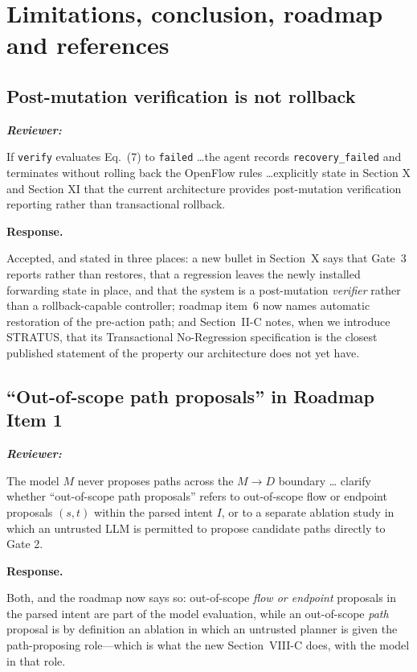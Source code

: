 \documentclass[11pt,a4paper]{article}
\newenvironment{reviewer}{\par\medskip\noindent\begin{minipage}{\linewidth}\small\itshape\color{quote}\textbf{Reviewer:}\par}{\end{minipage}\medskip\par}
\newenvironment{response}{\par\noindent\begin{minipage}{\linewidth}\small\textbf{Response.}\par}{\end{minipage}\medskip\par}
\begin{document}
\section{Limitations, conclusion, roadmap and references}

\subsection{Post-mutation verification is not rollback}

\begin{reviewer}
If \texttt{verify} evaluates Eq.~(7) to \texttt{failed} \dots the agent
records \texttt{recovery\_failed} and terminates without rolling back the
OpenFlow rules \dots explicitly state in Section X and Section XI that the
current architecture provides post-mutation verification reporting rather
than transactional rollback.
\end{reviewer}

\begin{response}
Accepted, and stated in three places: a new bullet in Section~X says
that Gate~3 reports rather than restores, that a regression leaves the
newly installed forwarding state in place, and that the system is a
post-mutation \emph{verifier} rather than a rollback-capable controller;
roadmap item~6 now names automatic restoration of the pre-action path; and
Section~II-C notes, when we introduce STRATUS, that its Transactional
No-Regression specification is the closest published statement of the
property our architecture does not yet have.
\end{response}

\subsection{``Out-of-scope path proposals'' in Roadmap Item 1}

\begin{reviewer}
The model $M$ never proposes paths across the $M \to D$ boundary \dots
clarify whether ``out-of-scope path proposals'' refers to out-of-scope
flow or endpoint proposals $(s,t)$ within the parsed intent $I$, or to a
separate ablation study in which an untrusted LLM is permitted to propose
candidate paths directly to Gate 2.
\end{reviewer}

\begin{response}
Both, and the roadmap now says so: out-of-scope \emph{flow or endpoint}
proposals in the parsed intent are part of the model evaluation, while an
out-of-scope \emph{path} proposal is by definition an ablation in which an
untrusted planner is given the path-proposing role---which is what the new
Section~VIII-C does, with the model in that role.
\end{response}
\end{document}
